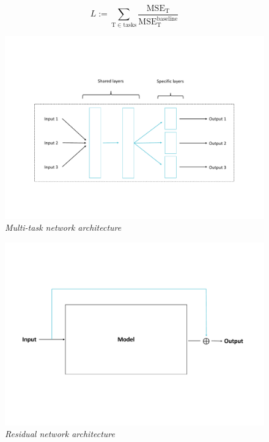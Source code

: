\documentclass{article}
\newcommand{\saut}{\vspace{10px}}
\begin{document}
\saut

\[
	L := \sum_{\mathrm T \in \mathrm{tasks}}
	\frac{\mathrm{MSE}_{\mathrm T}}{\mathrm{MSE}^{\mathrm{baseline}}_{\mathrm T}}
\]

\vspace{-40px}

\begin{figure}[H]
    \centering
    \includegraphics[width=.85\linewidth]{img/heads.pdf}
    \vspace{-30px}
    \caption{\textit{Multi-task network architecture}}
    \label{fig:Fig. 2}
\end{figure}

\vspace{-30px}

\begin{figure}[H]
    \centering
    \includegraphics[width=.85\linewidth]{img/residual.pdf}
    \vspace{-30px}
    \caption{\textit{Residual network architecture}}
    \label{fig:Fig. 3}
\end{figure}
\end{document}
